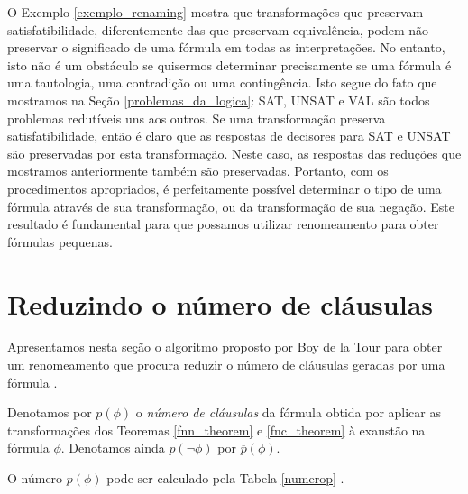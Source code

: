 O Exemplo \ref{exemplo_renaming} mostra que transformações que preservam satisfatibilidade, diferentemente das que preservam equivalência, podem não preservar o significado de uma fórmula em todas as interpretações. No entanto, isto não é um obstáculo se quisermos determinar precisamente se uma fórmula é uma tautologia, uma contradição ou uma contingência. Isto segue do fato que mostramos na Seção \ref{problemas_da_logica}: SAT, UNSAT e VAL são todos problemas redutíveis uns aos outros. Se uma transformação preserva satisfatibilidade, então é claro que as respostas de decisores para SAT e UNSAT são preservadas por esta transformação. Neste caso, as respostas das reduções que mostramos anteriormente também são preservadas. Portanto, com os procedimentos apropriados, é perfeitamente possível determinar o tipo de uma fórmula através de sua transformação, ou da transformação de sua negação. Este resultado é fundamental para que possamos utilizar renomeamento para obter fórmulas pequenas.

\section{Reduzindo o número de cláusulas}

\indent

Apresentamos nesta seção o algoritmo proposto por Boy de la Tour para obter um renomeamento que procura reduzir o número de cláusulas geradas por uma fórmula \cite{de1992optimality}.

\begin{definition}
	Denotamos por $p(\phi)$ o \emph{número de cláusulas} da fórmula obtida por aplicar as transformações dos Teoremas \ref{fnn_theorem} e \ref{fnc_theorem} à exaustão na fórmula $\phi$. Denotamos ainda $p(\neg \phi)$ por $\overline{p}(\phi)$.
\end{definition}

O número $p(\phi)$ pode ser calculado pela Tabela \ref{numerop} \cite{de1992optimality}.

